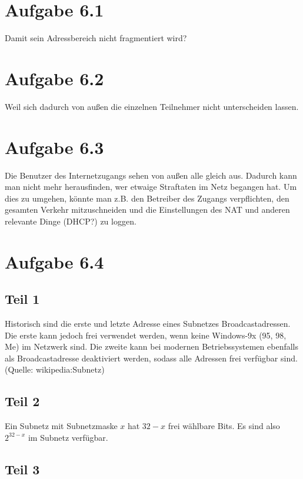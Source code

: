 \documentclass[10pt,a4paper]{article}
\begin{document}
\section{Aufgabe 6.1}

Damit sein Adressbereich nicht fragmentiert wird?

\section{Aufgabe 6.2}

Weil sich dadurch von außen die einzelnen Teilnehmer nicht unterscheiden lassen.

\section{Aufgabe 6.3}

Die Benutzer des Internetzugangs sehen von außen alle gleich aus. Dadurch kann
man nicht mehr herausfinden, wer etwaige Straftaten im Netz begangen hat. Um
dies zu umgehen, könnte man z.B. den Betreiber des Zugangs verpflichten, den
gesamten Verkehr mitzuschneiden und die Einstellungen des NAT und anderen
relevante Dinge (DHCP?) zu loggen.

\section{Aufgabe 6.4}

\subsection{Teil 1}

Historisch sind die erste und letzte Adresse eines Subnetzes
Broadcastadressen. Die erste kann jedoch frei verwendet werden, wenn keine
Windows-9x (95, 98, Me) im Netzwerk sind. Die zweite kann bei modernen
Betriebssystemen ebenfalls als Broadcastadresse deaktiviert werden, sodass alle
Adressen frei verfügbar sind. (Quelle: wikipedia:Subnetz)

\subsection{Teil 2}

Ein Subnetz mit Subnetzmaske $x$ hat $32 - x$ frei wählbare Bits. Es sind also
$2^{32 - x}$ im Subnetz verfügbar.

\subsection{Teil 3}
\end{document}
